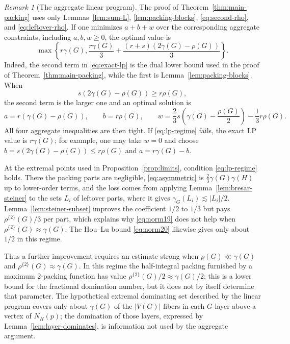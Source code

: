 \documentclass[10pt]{amsart}
\theoremstyle{remark}
\newtheorem{remark}[theorem]{Remark}
\newcommand{\N}{N}
\newcommand{\V}{V}
\newcommand{\rhoTwo}{\rho^{\{2\}}}
\begin{document}
\begin{remark}[The aggregate linear program]\label{rem:lp-exact}
The proof of Theorem~\ref{thm:main-packing} uses only
Lemmas~\ref{lem:sum-L}, \ref{lem:packing-blocks},
\eqref{eq:second-rho}, and \eqref{eq:leftover-rho}. If one minimizes
$a+b+w$ over the corresponding aggregate constraints, including
$a,b,w\geq0$, the optimal value is
\begin{equation}
 \max\left\{
 r\gamma(G),
 \frac{r\gamma(G)}3
 +\frac{(r+s)(2\gamma(G)-\rho(G))}{3}
 \right\}.
 \label{eq:exact-lp}
\end{equation}
Indeed, the second term in \eqref{eq:exact-lp} is the dual lower bound used in
the proof of Theorem~\ref{thm:main-packing}, while the first is
Lemma~\ref{lem:packing-blocks}. When
\begin{equation}
 s(2\gamma(G)-\rho(G))\geq r\rho(G),
 \label{eq:lp-regime}
\end{equation}
the second term is the larger one and an optimal solution is
\[
 a=r(\gamma(G)-\rho(G)),
 \qquad b=r\rho(G),
 \qquad
 w=\frac23s\left(\gamma(G)-\frac{\rho(G)}2\right)-\frac13r\rho(G).
\]
All four aggregate inequalities are then tight. If
\eqref{eq:lp-regime} fails, the exact LP value is $r\gamma(G)$; for example,
one may take $w=0$ and choose
$b=s(2\gamma(G)-\rho(G))\leq r\rho(G)$ and
$a=r\gamma(G)-b$.

At the extremal points used in Proposition~\ref{prop:limits}, condition
\eqref{eq:lp-regime} holds. There the packing parts are negligible,
\eqref{eq:asymmetric} is $\tfrac23\gamma(G)\gamma(H)$ up to lower-order terms,
and the loss comes from applying Lemma~\ref{lem:bresar-steiner} to the sets
$L_i$ of leftover parts, where it gives
$\gamma_G(L_i)\lesssim |L_i|/2$. Lemma~\ref{lem:steiner-subset} improves the
coefficient $1/2$ to $1/3$ but pays $\rhoTwo(G)/3$ per part, which explains why
\eqref{eq:norm19} does not help when $\rhoTwo(G)\approx\gamma(G)$. The
Hou--Lu bound \eqref{eq:norm20} likewise gives only about $1/2$ in this regime.

Thus a further improvement requires an estimate strong when
$\rho(G)\ll\gamma(G)$ and $\rhoTwo(G)\approx\gamma(G)$. In this regime the
half-integral packing furnished by a maximum $2$-packing function has value
$\rhoTwo(G)/2\approx\gamma(G)/2$; this is a lower bound for the fractional
domination number, but it does not by itself determine that parameter. The
hypothetical extremal dominating set described by the linear program covers
only about $\gamma(G)$ of the $|\V(G)|$ fibers in each $G$-layer above a vertex
of $\N_H(p)$; the domination of those layers, expressed by
Lemma~\ref{lem:layer-dominates}, is information not used by the aggregate
argument.
\end{remark}
\end{document}
